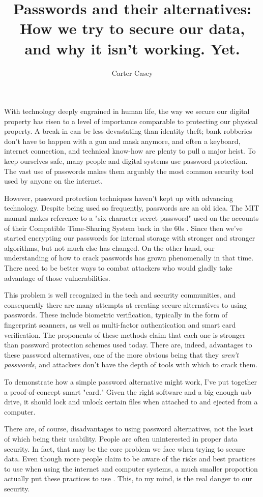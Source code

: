 \documentclass[jou]{apa6}
\title{Passwords and their alternatives: How we try to secure our data, and why it isn't working. Yet.}
\author{Carter Casey}
\affiliation{Mentor: Ming Chow \\ Tufts University Department of Computer Science}
\begin{document}
\maketitle
\doublespacing
With technology deeply engrained in human life, the way we secure our digital property has risen to a level of importance comparable to protecting our physical property. A break-in can be less devastating than identity theft; bank robberies don't have to happen with a gun and mask anymore, and often a keyboard, internet connection, and technical know-how are plenty to pull a major heist. To keep ourselves safe, many people and digital systems use password protection. The vast use of passwords makes them arguably the most common security tool used by anyone on the internet.

However, password protection techniques haven't kept up with advancing technology. Despite being used so frequently, passwords are an old idea. The MIT manual makes reference to a "six character secret password" used on the accounts of their Compatible Time-Sharing System back in the 60s \parencite{mit65}. Since then we've started encrypting our passwords for internal storage with stronger and stronger algorithms, but not much else has changed. On the other hand, our understanding of how to crack passwords has grown phenomenally in that time. There need to be better ways to combat attackers who would gladly take advantage of those vulnerabilities.

This problem is well recognized in the tech and security communities, and consequently there are many attempts at creating secure alternatives to using passwords. These include biometric verification, typically in the form of fingerprint scanners, as well as multi-factor authentication and smart card verification. The proponents of these methods claim that each one is stronger than password protection schemes used today. There are, indeed, advantages to these password alternatives, one of the more obvious being that they \textit{aren't passwords}, and attackers don't have the depth of tools with which to crack them.

To demonstrate how a simple password alternative might work, I've put together a proof-of-concept smart "card." Given the right software and a big enough usb drive, it should lock and unlock certain files when attached to and ejected from a computer.

There are, of course, disadvantages to using password alternatives, not the least of which being their usability. People are often uninterested in proper data security. In fact, that may be the core problem we face when trying to secure data. Even though more people claim to be aware of the risks and best practices to use when using the internet and computer systems, a much smaller proportion actually put these practices to use \parencite{mcafee11}. This, to my mind, is the real danger to our security.
\end{document}
